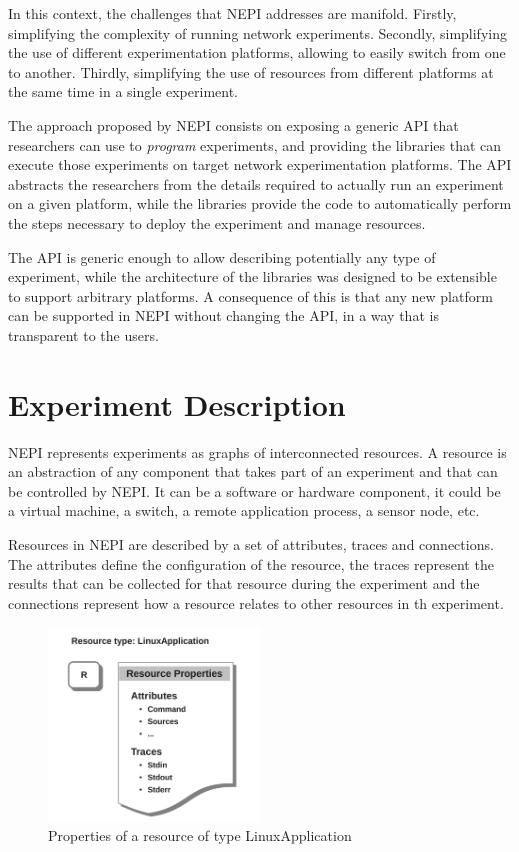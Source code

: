In this context, the challenges that NEPI addresses are manifold. 
Firstly, simplifying the complexity of running network experiments. 
Secondly, simplifying the use of different experimentation platforms, 
allowing to easily switch from one to another. 
Thirdly, simplifying the
use of resources from different platforms at the same time in 
a single experiment.

The approach proposed by NEPI consists on exposing a generic API
that researchers can use to \emph{program} experiments, and 
providing the libraries that can execute those experiments on 
target network experimentation platforms. The API abstracts the
researchers from the details required to actually run an experiment
on a given platform, while the libraries provide the code to 
automatically perform the steps necessary to deploy the experiment 
and manage resources.

The API is generic enough to allow describing potentially any 
type of experiment, while the architecture of the libraries was 
designed to be extensible to support arbitrary platforms.
A consequence of this is that any new platform can be supported in 
NEPI without changing the API, in a way that is transparent 
to the users.

% 
\section{Experiment Description}

NEPI represents experiments as graphs of interconnected resources.
A resource is an abstraction of any component that takes part of an 
experiment and that can be controlled by NEPI. 
It can be a software or hardware component, it could be a virtual 
machine, a switch, a remote application process, a sensor node, etc.

Resources in NEPI are described by a set of attributes, traces and 
connections. The attributes define the configuration of the resource,
the traces represent the results that can be collected for that resource
during the experiment and the connections represent how a resource relates
to other resources in th experiment.

\begin{figure}[h]
  \centering
  \includegraphics[width=0.5\textwidth]{intro_resource}
  \caption{Properties of a resource of type LinuxApplication}
  \label{fig:intro_resources}
\end{figure}

